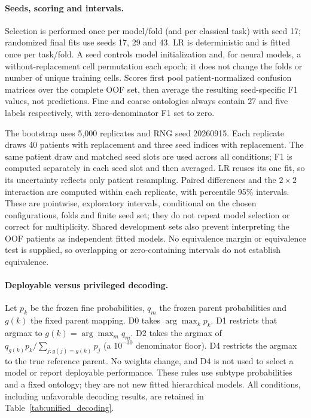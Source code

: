 \paragraph{Seeds, scoring and intervals.}
Selection is performed once per model/fold (and per classical task) with
seed 17; randomized final fits use seeds 17, 29 and 43. LR is deterministic
and is fitted once per task/fold. A seed controls model initialization and,
for neural models, a without-replacement cell permutation each epoch; it
does not change the folds or number of unique training cells. Scores first
pool patient-normalized confusion matrices over the complete OOF set, then
average the resulting seed-specific F1 values, not predictions.
Fine and coarse ontologies always contain 27 and five labels respectively,
with zero-denominator F1 set to zero.

The bootstrap uses 5{,}000 replicates and RNG seed 20260915. Each replicate
draws 40 patients with replacement and three seed indices with replacement.
The same patient draw and matched seed slots are used across all conditions;
F1 is computed separately in each seed slot and then averaged. LR reuses its
one fit, so its uncertainty reflects only patient resampling. Paired
differences and the $2\times2$ interaction are computed within each replicate,
with percentile 95\% intervals. These are pointwise, exploratory intervals,
conditional on the chosen configurations, folds and finite seed set; they
do not repeat model selection or correct for multiplicity. Shared development
sets also prevent interpreting the OOF patients as independent fitted models.
No equivalence margin or equivalence test is supplied, so overlapping or
zero-containing intervals do not establish equivalence.

\paragraph{Deployable versus privileged decoding.}
Let $p_k$ be the frozen fine probabilities, $q_m$ the frozen parent
probabilities and $g(k)$ the fixed parent mapping. D0 takes $\arg\max_k p_k$.
D1 restricts that argmax to $g(k)=\arg\max_m q_m$.
D2 takes the argmax of
$q_{g(k)}p_k/\sum_{j:g(j)=g(k)}p_j$ (a $10^{-30}$ denominator floor).
D4 restricts the argmax to the true reference parent. No weights change,
and D4 is not used to select a model or report deployable performance.
These rules use subtype probabilities and a fixed ontology; they are not
new fitted hierarchical models. All conditions, including unfavorable
decoding results, are retained in Table~\ref{tab:unified_decoding}.



